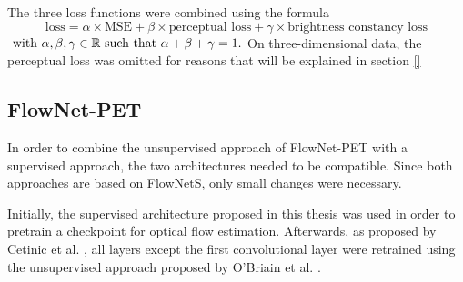 The three loss functions were combined using the formula \begin{equation}
	\text{loss}=\alpha \times  \text{MSE} + \beta \times  \text{perceptual loss} + \gamma \times  \text{brightness constancy loss}
\end{equation}
$\\\text{  with }\alpha, \beta, \gamma \in \mathbb{R} \text{ such that }  \alpha + \beta + \gamma = 1.$
On three-dimensional data, the perceptual loss was omitted for reasons that will be explained in section \eqref{} %
\subsection{FlowNet-PET}
In order to combine the unsupervised approach of FlowNet-PET with a supervised approach, the two architectures needed to be compatible. Since both approaches are based on FlowNetS\cite{Flownet2pytorch2023}, only small changes were necessary. 

Initially, the supervised architecture proposed in this thesis was used in order to pretrain a checkpoint for optical flow estimation. Afterwards, as proposed by Cetinic et al. \cite{cetinicFinetuningConvolutionalNeural2018}, all layers except the first convolutional layer were retrained using the unsupervised approach proposed by O'Briain et al. \cite{obriainFlowNetPETUnsupervisedLearning2022}.